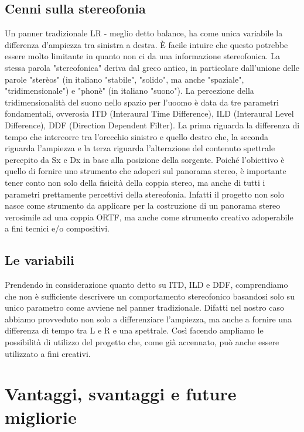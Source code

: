 \documentclass{article}
\begin{document}
    \subsection{Cenni sulla stereofonia}
    
    Un panner tradizionale LR - meglio detto balance, ha come unica variabile la differenza d'ampiezza tra sinistra a destra. È facile intuire che questo potrebbe essere molto limitante in quanto non ci da una informazione stereofonica. La stessa parola "stereofonica" deriva dal greco antico, in particolare dall'unione delle parole "sterèos" (in italiano "stabile", "solido", ma anche "spaziale", "tridimensionale") e "phonè" (in italiano "suono"). La percezione della tridimensionalità del suono nello spazio per l'uoomo è data da tre parametri fondamentali, ovverosia ITD (Interaural Time Difference), ILD (Interaural Level Difference), DDF (Direction Dependent Filter). La prima riguarda la differenza di tempo che intercorre tra l'orecchio sinistro e quello destro che, la seconda riguarda l'ampiezza e la terza riguarda l'alterazione del contenuto spettrale percepito da Sx e Dx in base alla posizione della sorgente.
    Poiché l'obiettivo è quello di fornire uno strumento che adoperi sul panorama stereo, è importante tener conto non solo della fisicità della coppia stereo, ma anche di tutti i parametri prettamente percettivi della stereofonia. Infatti il progetto non solo nasce come strumento da applicare per la costruzione di un panorama stereo verosimile ad una coppia ORTF, ma anche come strumento creativo adoperabile a fini tecnici e/o compositivi.

    \subsection{Le variabili}
    Prendendo in considerazione quanto detto su ITD, ILD e DDF, comprendiamo che non è sufficiente descrivere un comportamento stereofonico basandosi solo su unico parametro come avviene nel panner tradizionale. Difatti nel nostro caso abbiamo provveduto non solo a differenziare l'ampiezza, ma anche a fornire una differenza di tempo tra L e R e una spettrale. Così facendo ampliamo le possibilità di utilizzo del progetto che, come già accennato, può anche essere utilizzato a fini creativi.

\section{Vantaggi, svantaggi e future migliorie}
\end{document}
